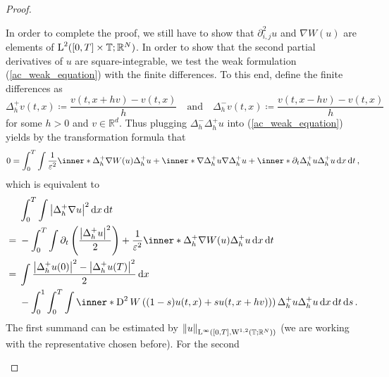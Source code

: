 \begin{proof}
\begin{description}[wide=0pt]
		In order to complete the proof, we still have to show that $ \partial_{ 
		i , j }^{ 2 } u$ and $ \nabla W ( u) $ are elements of $ \operatorname{L}^{ 2 } ( [ 
		0 , T ] \times \operatorname{\mathbb{T}} ; \mathbb{ R }^{ N } ) $.
		In order to show that the second partial derivatives of $ u $ are square-integrable, we test the weak formulation (\ref{ac_weak_equation}) with the finite differences. To this end, define the finite differences as
		\begin{equation*}
			\Delta_{ h }^{ + } v ( t , x ) \coloneqq \frac{ v ( t , x + h v ) - 
			v ( t , x ) }{ h }
			\quad\text{and}\quad
			\Delta_{ h }^{ - } v ( t , x ) \coloneqq \frac{ v ( t , x - h v ) - v ( t , x ) }{ h }
		\end{equation*}
		for some $ h > 0 $ and $ v \in \mathbb{ R }^{ d } $. Thus plugging $ \Delta_{ h }^{ - } \Delta_{ h }^{ + } u $ into (\ref{ac_weak_equation}) yields by the transformation formula that
		\begin{equation*}
			0
			=
			\int_{ 0 }^{ T }
			\int
			\frac{ 1 }{ \varepsilon^{ 2 } }
			\inner*{ \Delta_{ h }^{ + } \nabla W ( u ) }{ \Delta_{ h }^{ + } u }
			+
			\inner*{ \nabla \Delta_{ h }^{ + } u }{ \nabla \Delta_{ h }^{ + } u }
			+
			\inner*{ \partial_{ t } \Delta_{ h }^{ + } u }{ \Delta_{ h }^{ + } u }
			\dd{ x }
			\dd{ t },
		\end{equation*}
		which is equivalent to
		\begin{align*}
			& \int_{ 0 }^{ T }
			\int
			\abs{ \Delta_{ h }^{ + } \nabla u }^{ 2 }
			\dd{ x }
			\dd{ t }
			\\
			={} &
			-
			\int_{ 0 }^{ T }
			\int
			\partial_{ t } \left( \frac{ \abs{ \Delta_{ h }^{ + } u }^{ 2 } }{ 2 } \right)
			+
			\frac{ 1 }{ \varepsilon^{ 2 } }
			\inner*{ \Delta_{ h }^{ + } \nabla W ( u ) }{ \Delta_{ h }^{ + } u }
			\dd{ x }
			\dd{ t }
			\\
			={} &
			\int  
			\frac{ \abs{ \Delta_{ h }^{ + } u ( 0 ) }^{ 2 } - \abs{ \Delta_{ h }^{ + } u ( T ) }^{ 2 } }{ 2 }
			\dd{ x }
			\\
			& -
			\int_{ 0 }^{ 1 }
			\int_{ 0 }^{ T }
			\int
			\inner*{ 
				\diff^{ 2 } W \left( ( 1 - s ) u ( t, x  ) + s u( t,  x + h v ) ) \right) 
				\Delta_{ h }^{ + } u
			}{
				\Delta_{ h }^{ + } u 
			}
			\dd{ x }
			\dd{ t }
			\dd{ s }.
		\end{align*}
		The first summand can be estimated by $ \norm{ u }_{ \operatorname{L}^{ \infty } ( 
		[0 , T ] , \operatorname{W}^{ 1 , 2 } ( \operatorname{\mathbb{T}} ; \mathbb{ R }^{ N } ) ) } $ (we 
		are working with the representative chosen before). For the second 

\end{description}
\end{proof}

